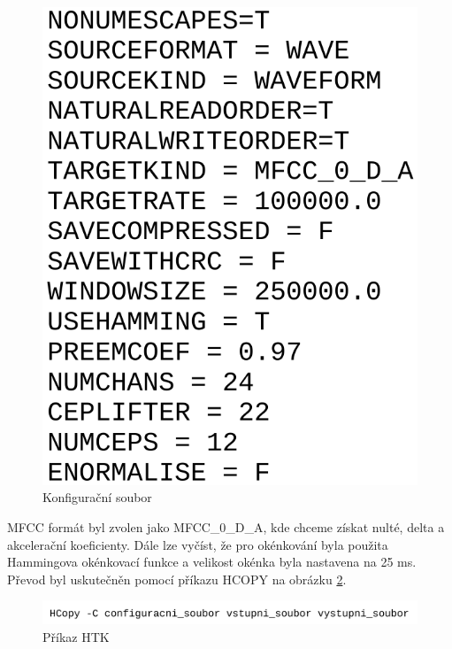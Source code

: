 \documentclass[FM,BP]{tulthesis}
\begin{document}
\begin{figure}[htbp]
\centerline{\includegraphics[scale=.2,keepaspectratio]{htk_config.png}}
\caption{Konfigurační soubor}
\label{fig:htk_config}
\end{figure}
\FloatBarrier

MFCC formát byl zvolen jako MFCC\_0\_D\_A, kde chceme získat nulté, delta a akcelerační koeficienty. Dále lze vyčíst, že pro okénkování byla použita Hammingova okénkovací funkce a velikost okénka byla nastavena na 25 ms. Převod byl uskutečněn pomocí příkazu HCOPY na obrázku \ref{fig:htk}.

\begin{figure}[htbp]
\centerline{\includegraphics[width=\textwidth,height=\textheight,keepaspectratio]{htk_command.png}}
\caption{Příkaz HTK}
\label{fig:htk}
\end{figure}
\FloatBarrier
\end{document}
